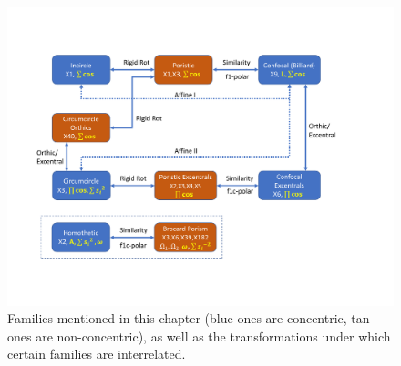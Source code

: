 \begin{figure}
    \centering
    \includegraphics[width=\textwidth]{chap_03/pics/pics_03_250_poncelet_transformations.pdf}
  \caption{Families mentioned in this chapter (blue ones are concentric, tan ones are non-concentric), as well as the transformations under which certain families are interrelated.}
    \label{fig:03-transformations}
\end{figure}